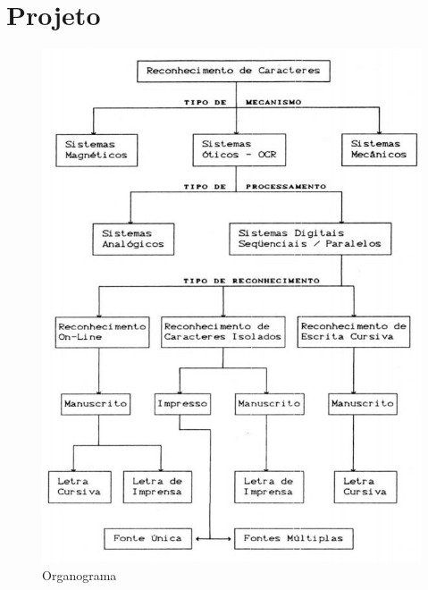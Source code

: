 \section{Projeto}
\lipsum

\begin{figure}[!htb]
	\centering
	\includegraphics[scale=0.4]{img/organograma-tipos.jpg}
	\caption{Organograma}
	\label{Organograma}
\end{figure}
